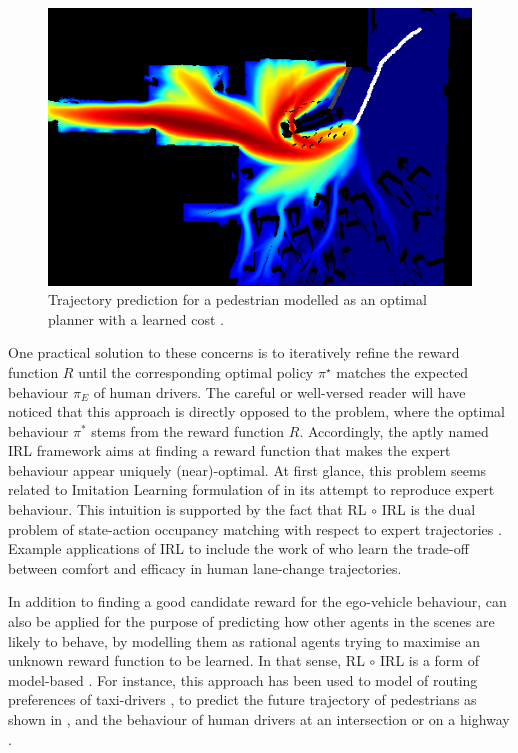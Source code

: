 \begin{figure}[ht]
	\centering
	\includegraphics[width=0.6\linewidth]{img/pedestrian}
	\caption{Trajectory prediction for a pedestrian modelled as an optimal planner with a learned cost \citep{Ziebart2009}.}
	\label{fig:irl-pedestrian}
\end{figure}


One practical solution to these concerns is to iteratively refine the reward function $R$ until the corresponding optimal policy $\pi^\star$ matches the expected behaviour $\pi_E$ of human drivers. The careful or well-versed reader will have noticed that this approach is directly opposed to the  problem, where the optimal behaviour $\pi^*$ stems from the reward function $R$. Accordingly, the aptly named \gls{IRL} framework aims at finding a reward function that makes the expert behaviour appear uniquely (near)-optimal. At first glance, this problem seems related to Imitation Learning formulation of  in its attempt to reproduce expert behaviour. This intuition is supported by the fact that \gls{RL} $\circ$ \gls{IRL} is the dual problem of state-action occupancy matching with respect to expert trajectories \citep{Ho2016}. Example applications of \gls{IRL} to  include the work of \citet{Kuderer2015} who learn the trade-off between comfort and efficacy in human lane-change trajectories. 

In addition to finding a good candidate reward for the ego-vehicle behaviour,  can also be applied for the purpose of predicting how other agents in the scenes are likely to behave, by modelling them as rational agents trying to maximise an unknown reward function to be learned. In that sense, \gls{RL} $\circ$ \gls{IRL} is a form of model-based .
For instance, this approach has been used to model of routing preferences of taxi-drivers \citep{Ziebart2008}, to predict the future trajectory of pedestrians \citep{Ziebart2009} as shown in , and the behaviour of human drivers at an intersection \citep{Sun2019} or on a highway \citep{Sadigh2016}.


